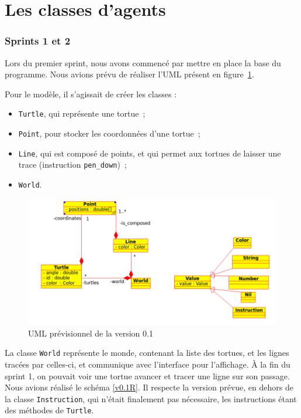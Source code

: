 \section{Les classes d'agents}
\subsubsection{Sprints 1 et 2}
Lors du premier sprint, nous avons commencé par mettre en place la base du programme. Nous avions prévu de réaliser l'UML présent en figure~\ref{v0.1}.

 Pour le modèle, il s'agissait de créer les classes :
\begin{itemize}
\item \verb|Turtle|, qui représente une tortue~;
\item \verb|Point|, pour stocker les coordonnées d'une tortue~;
\item \verb|Line|, qui est composé de points, et qui permet aux tortues de laisser une trace (instruction \verb|pen_down|)~;
\item \verb|World|.
\end{itemize}


\begin{figure}[h]
\centering
\includegraphics[scale=0.5]{doc/report/uml/v01.png}
\caption{\label{v0.1} UML prévisionnel de la version 0.1}
\end{figure}


La classe \verb|World| représente le monde, contenant la liste des tortues, et les lignes tracées par celles-ci, et communique avec l'interface pour l'affichage.
À la fin du sprint 1, on pouvait voir une tortue avancer et tracer une ligne sur son passage.
Nous avions réalisé le schéma \ref{v0.1R}. Il respecte la version prévue, en dehors de la classe \verb|Instruction|, qui n'était finalement pas nécessaire, les instructions étant des méthodes de \verb|Turtle|.


